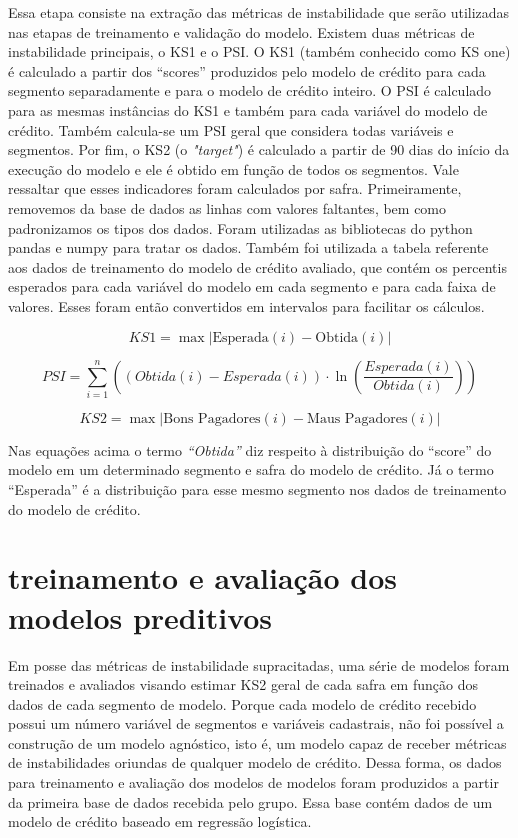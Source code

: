  Essa etapa consiste na extração das métricas de instabilidade que serão utilizadas nas etapas de  treinamento e validação do modelo. Existem duas métricas de instabilidade principais, o KS1 e o PSI. O KS1 (também conhecido como KS one)  é calculado a partir dos “scores” produzidos pelo modelo de crédito para cada segmento separadamente e para o modelo de crédito inteiro. O PSI é calculado para as mesmas instâncias do KS1 e também para cada variável do modelo de crédito. Também calcula-se um PSI geral que considera todas variáveis e segmentos. Por fim, o KS2 (o \emph{"target"}) é calculado a partir de 90 dias do início da execução do modelo e ele é obtido em função de todos os segmentos. Vale ressaltar que esses indicadores foram calculados por safra.
	Primeiramente, removemos da base de dados as linhas com valores faltantes, bem como padronizamos os tipos dos dados. Foram utilizadas as bibliotecas do python pandas e numpy para tratar os dados. Também foi utilizada a tabela referente aos dados de treinamento do modelo de crédito avaliado, que contém os percentis esperados para cada variável do modelo em cada segmento e para cada faixa de valores. Esses foram então convertidos em intervalos para facilitar os cálculos.

\begin{equation}
KS1 = \max \left| \text{Esperada}(i) - \text{Obtida}(i) \right|
\end{equation}
    
\begin{equation}
PSI = \sum_{i=1}^{n} \left( (Obtida(i) - Esperada(i) ) \cdot \ln\left(\frac{{Esperada(i)}}{{Obtida(i)}}\right) \right)
\end{equation}

\begin{equation}
    KS2 = \max {\left| \text{Bons Pagadores}(i) - \text{Maus Pagadores}(i) \right| }
\end{equation}

Nas equações acima o termo \emph{“Obtida”} diz respeito à distribuição do “score” do modelo em um determinado segmento e safra do modelo de crédito. Já o termo “Esperada” é a distribuição para esse mesmo segmento nos dados de treinamento do modelo de crédito.
\section{treinamento e avaliação dos modelos preditivos}

Em posse das métricas de instabilidade supracitadas, uma série de modelos foram treinados e avaliados visando estimar KS2 geral de cada safra em função dos dados de cada segmento de modelo.
	Porque cada modelo de crédito recebido possui um número variável de segmentos e variáveis cadastrais, não foi possível a construção de um modelo agnóstico, isto é, um modelo capaz de receber métricas de instabilidades oriundas de qualquer modelo de crédito. Dessa forma, os dados para treinamento e avaliação dos modelos de modelos foram produzidos a partir da primeira base de dados recebida pelo grupo. Essa base contém dados de um modelo de crédito baseado em regressão logística.	
	

